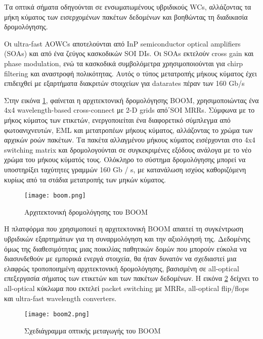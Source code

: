 Τα οπτικά σήματα οδηγούνται σε ενσωματωμένους υβριδικούς WCs,
αλλάζοντας τα μήκη κύματος των εισερχομένων πακέτων δεδομένων και
βοηθώντας τη διαδικασία δρομολόγησης.

Οι ultra-fast AOWCs αποτελούνται από InP semiconductor optical
amplifiers (SOAs) και από ένα ζεύγος κασκοδικών SOI DIs. Οι SOAs
εκτελούν cross gain και phase modulation, ενώ τα κασκοδικά
συμβολόμετρα χρησιμοποιούνται για chirp filtering και αναστροφή
πολικότητας. Αυτός ο τύπος μετατροπής μήκους κύματος έχει επιδειχθεί
με εξαρτήματα διακριτών στοιχείων για datarates πέραν των 160 Gb/s
\cite{5295346}

Στην εικόνα \ref{fig:boom}, φαίνεται η αρχιτεκτονική δρομολόγησης
BOOM, χρησιμοποιώντας ένα 4x4 wavelength-based cross-connect με 2-D
grids από΄SOI MRRs. Σύμφωνα με το μήκος κύματος των ετικετών,
ενεργοποιείται ένα διαφορετικό σύμπλεγμα από φωτοανιχνευτών, EML και
μετατροπέων μήκους κύματος, αλλάζοντας το χρώμα των αρχικών ροών
πακέτων. Τα πακέτα αλλαγμένου μήκους κύματος εισέρχονται στο 4x4
switching matrix και δρομολογούνται σε συγκεκριμένες εξόδους ανάλογα
με το νέο χρώμα του μήκους κύματός τους. Ολόκληρο το σύστημα
δρομολόγησης μπορεί να υποστηρίξει ταχύτητες γραμμών 160 Gb / s, με
κατανάλωση ισχύος καθοριζόμενη κυρίως από τα στάδια μετατροπής των
μηκών κύματος.

\begin{figure}[h]
  \centering
  \texttt{[image: boom.png]}
  \caption{Αρχιτεκτονική δρομολόγησης του ΒΟΟΜ}
  \label{fig:boom}
\end{figure}

Η πλατφόρμα που χρησιμοποιεί η αρχιτεκτονική BOOM απαιτεί τη
συγκέντρωση υβριδικών εξαρτημάτων για τη συναρμολόγηση και την
αξιολόγησή της. Δεδομένης όμως της διαθεσιμότητας μιας ποικιλίας
παθητικών δομών που μπορούν εύκολα να διασυνδεθούν με εμπορικά ενεργά
στοιχεία, θα ήταν δυνατόν να σχεδιαστεί μια ελαφρώς τροποποιημένη
αρχιτεκτονική δρομολόγησης, βασισμένη σε all-optical επεξεργασία
σήματος των ετικετών και των πακέτων δεδομένων. Η εικόνα \ref{fig:boom2}
δείχνει το all-optical κύκλωμα που εκτελεί packet switching με MRRs,
all-optical flip/flops και ultra-fast wavelength converters.

\begin{figure}[h]
  \centering
  \texttt{[image: boom2.png]}
  \caption{Σχεδιάγραμμα οπτικής μεταγωγής του BOOM}
  \label{fig:boom2}
\end{figure}

